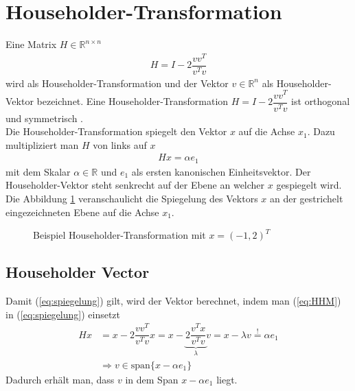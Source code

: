 \section{Householder-Transformation}
Eine Matrix $H \in \mathbb{R}^{n \times n}$ 
\begin{align}
H = I - 2 \dfrac{vv^T}{v^Tv} \label{eq:HHM}
\end{align}
wird als Householder-Transformation und der Vektor $v \in \mathbb{R}^n$ als Householder-Vektor bezeichnet.
Eine Householder-Transformation $H = I - 2 \dfrac{vv^T}{v^Tv}$ ist orthogonal und symmetrisch \cite{num1}.\\
Die Householder-Transformation spiegelt den Vektor $x$ auf die Achse $x_1$.
Dazu multipliziert man $H$ von links auf $x$
\begin{align}
Hx=\alpha e_1 \label{eq:spiegelung}
\end{align}
mit dem Skalar $\alpha \in \mathbb{R}$ und $e_1$ als ersten kanonischen Einheitsvektor. Der Householder-Vektor steht senkrecht auf der Ebene an welcher $x$ gespiegelt wird.\\
Die Abbildung \ref{fig:HHolder} veranschaulicht die Spiegelung des Vektors $x$ an der gestrichelt eingezeichneten Ebene auf die Achse $x_1$.
\begin{figure}[H]
	\centering
	
	\caption{Beispiel Householder-Transformation mit $x=(-1,2)^T$}
	\label{fig:HHolder}
\end{figure}




\subsection{Householder Vector}
Damit (\ref{eq:spiegelung}) gilt, wird der Vektor berechnet, 
indem man (\ref{eq:HHM}) in (\ref{eq:spiegelung}) einsetzt
\begin{align*}
Hx &= x - 2\dfrac{vv^T}{v^Tv} x = x - \underbrace{2\dfrac{v^Tx}{v^Tv}}_{\lambda} v = x - \lambda v \overset{!}{=} \alpha e_1 \\
&\Longrightarrow v \in \text{span}\{x - \alpha e_1\}
\end{align*}
Dadurch erhält man, dass $v$ in dem Span $x  - \alpha e_1$ liegt.\cite{num1}


